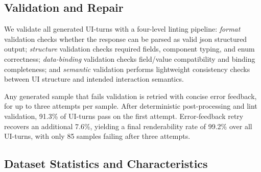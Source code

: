 \documentclass{llmxive}
\begin{document}
\subsection{Validation and Repair}
\label{subsec:data-validation}

We validate all generated UI-turns with a four-level linting pipeline:
\emph{format} validation checks whether the response can be parsed as valid json structured output;
\emph{structure} validation checks required fields, component typing, and enum correctness;
\emph{data-binding} validation checks field/value compatibility and binding completeness;
and \emph{semantic} validation performs lightweight consistency checks between UI structure and intended interaction semantics.

Any generated sample that fails validation is retried with concise error feedback, for up to
three attempts per sample. After deterministic post-processing and lint validation, 91.3\%
of UI-turns pass on the first attempt. Error-feedback retry recovers an additional 7.6\%,
yielding a final renderability rate of 99.2\% over all UI-turns, with only 85 samples failing
after three attempts.


\subsection{Dataset Statistics and Characteristics}
\label{subsec:data-stats}
\end{document}

